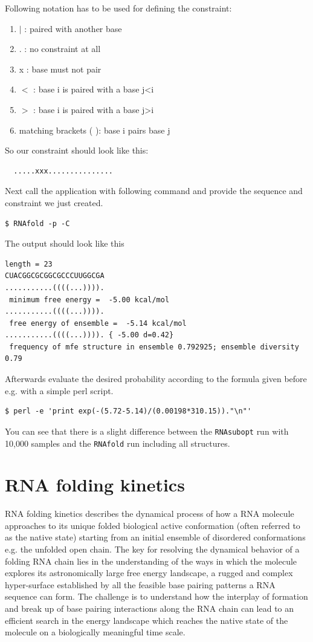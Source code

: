\documentclass[a4paper]{article}
\begin{document}
\noindent Following notation has to be used for defining the constraint:
\begin{enumerate}
\item $|$ : paired with another base
\item . : no constraint at all
\item x : base must not pair
\item $<$ : base i is paired with a base j<i
\item $>$ : base i is paired with a base j>i
\item matching brackets ( ): base i pairs base j\\
\end{enumerate}

\noindent So our constraint should look like this:
\begin{verbatim}
  .....xxx...............
\end{verbatim}
Next call the application with following command and provide the 
sequence and constraint we just created.
\begin{verbatim}
$ RNAfold -p -C
\end{verbatim}
The output should look like this 
\begin{verbatim}
length = 23
CUACGGCGCGGCGCCCUUGGCGA
...........((((...)))).
 minimum free energy =  -5.00 kcal/mol
...........((((...)))).
 free energy of ensemble =  -5.14 kcal/mol
...........((((...)))). { -5.00 d=0.42}
 frequency of mfe structure in ensemble 0.792925; ensemble diversity 0.79  
\end{verbatim}
\noindent
Afterwards evaluate the desired probability according to the formula given before
e.g. with a simple perl script.
\begin{verbatim}
$ perl -e 'print exp(-(5.72-5.14)/(0.00198*310.15))."\n"'
\end{verbatim}

You can see that there is a slight difference between the \texttt{RNAsubopt} run with 10,000 
samples and the \texttt{RNAfold} run including all structures. 

\pagebreak[3]
\section{RNA folding kinetics}
RNA folding kinetics describes the dynamical process of how a RNA molecule
approaches to its unique folded biological active conformation (often
referred to as the native state) starting from an initial ensemble of
disordered conformations e.g. the unfolded open chain. The key for
resolving the dynamical behavior of a folding RNA chain lies in the
understanding of the ways in which the molecule explores its astronomically
large free energy landscape, a rugged and complex hyper-surface established
by all the feasible base pairing patterns a RNA sequence can form. The
challenge is to understand how the interplay of formation and break up of
base pairing interactions along the RNA chain can lead to an efficient
search in the energy landscape which reaches the native state of the
molecule on a biologically meaningful time scale.
\end{document}
